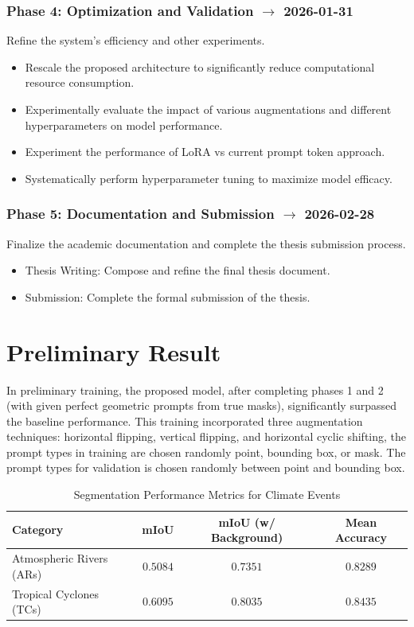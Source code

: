 \subsection*{Phase 4: Optimization and Validation $\mathbf{\rightarrow}$ 2026-01-31}
Refine the system's efficiency and other experiments.
\begin{itemize}
    \item Rescale the proposed architecture to significantly reduce computational resource consumption.
    \item Experimentally evaluate the impact of various augmentations and different hyperparameters on model performance.
    \item Experiment the performance of LoRA vs current prompt token approach.
    \item Systematically perform hyperparameter tuning to maximize model efficacy.
\end{itemize}


\subsection*{Phase 5: Documentation and Submission $\mathbf{\rightarrow}$ 2026-02-28}
Finalize the academic documentation and complete the thesis submission process.
\begin{itemize}
    \item Thesis Writing: Compose and refine the final thesis document.
    \item Submission: Complete the formal submission of the thesis.
\end{itemize}


\chapter{Preliminary Result}
In preliminary training, the proposed model, after completing phases 1 and 2 (with given perfect geometric prompts from true masks), significantly surpassed the baseline performance. This training incorporated three augmentation techniques: horizontal flipping, vertical flipping, and horizontal cyclic shifting, the prompt types in training are chosen randomly point, bounding box, or mask. The prompt types for validation is chosen randomly between point and bounding box.

\begin{table}[h!]
    \centering
    \caption{Segmentation Performance Metrics for Climate Events}
    \label{tab:climate_sam_metrics}
    \begin{tabular}{lccc}
        \toprule
        Category & mIoU & mIoU (w/ Background) & Mean Accuracy \\
        \midrule
        Atmospheric Rivers (ARs) & $0.5084$ & $0.7351$ & $0.8289$ \\
        Tropical Cyclones (TCs) & $0.6095$ & $0.8035$ & $0.8435$ \\
        \bottomrule
    \end{tabular}
\end{table}

